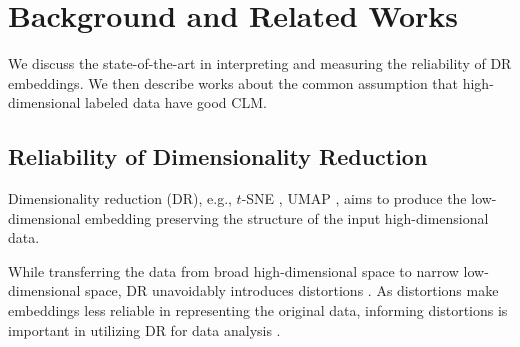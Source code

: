 \section{Background and Related Works}


We discuss the state-of-the-art in interpreting and measuring the reliability of DR embeddings. 
We then describe works about the common assumption that high-dimensional labeled data have good CLM.

\subsection{Reliability of Dimensionality Reduction}


Dimensionality reduction (DR), e.g., $t$-SNE \cite{maaten08jmlr}, UMAP \cite{mcinnes2020arxiv}, aims to produce the low-dimensional embedding preserving the structure of the input high-dimensional data. 



While transferring the data from broad high-dimensional space to narrow low-dimensional space, DR unavoidably introduces distortions \cite{nonato19tvcg, aupetit07neurocomputing}.
As distortions make embeddings less reliable in representing the original data, informing distortions is important in utilizing DR for data analysis \cite{nonato19tvcg, jeon21tvcg}.

